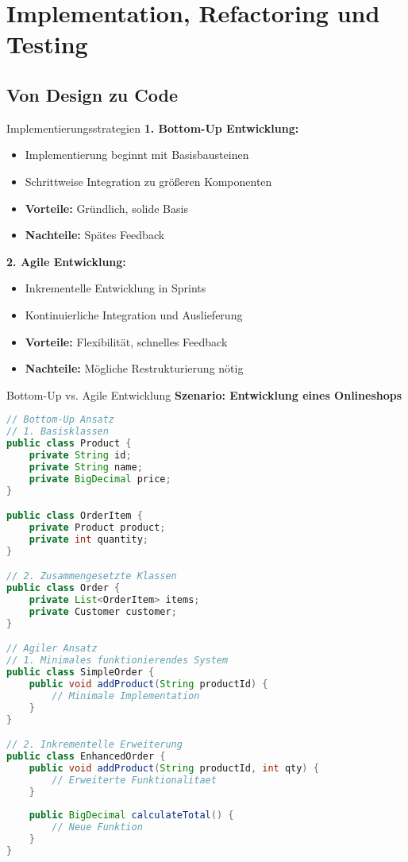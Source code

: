 \section{Implementation, Refactoring und Testing}

\subsection{Von Design zu Code}

\begin{concept}{Implementierungsstrategien}
\textbf{1. Bottom-Up Entwicklung:}
\begin{itemize}
    \item Implementierung beginnt mit Basisbausteinen
    \item Schrittweise Integration zu größeren Komponenten
    \item \textbf{Vorteile:} Gründlich, solide Basis
    \item \textbf{Nachteile:} Spätes Feedback
\end{itemize}

\textbf{2. Agile Entwicklung:}
\begin{itemize}
    \item Inkrementelle Entwicklung in Sprints
    \item Kontinuierliche Integration und Auslieferung
    \item \textbf{Vorteile:} Flexibilität, schnelles Feedback
    \item \textbf{Nachteile:} Mögliche Restrukturierung nötig
\end{itemize}
\end{concept}

\begin{example}{Bottom-Up vs. Agile Entwicklung}
\textbf{Szenario: Entwicklung eines Onlineshops}

\begin{lstlisting}[language=Java]
// Bottom-Up Ansatz
// 1. Basisklassen
public class Product {
    private String id;
    private String name;
    private BigDecimal price;
}

public class OrderItem {
    private Product product;
    private int quantity;
}

// 2. Zusammengesetzte Klassen
public class Order {
    private List<OrderItem> items;
    private Customer customer;
}

// Agiler Ansatz
// 1. Minimales funktionierendes System
public class SimpleOrder {
    public void addProduct(String productId) {
        // Minimale Implementation
    }
}

// 2. Inkrementelle Erweiterung
public class EnhancedOrder {
    public void addProduct(String productId, int qty) {
        // Erweiterte Funktionalitaet
    }
    
    public BigDecimal calculateTotal() {
        // Neue Funktion
    }
}
\end{lstlisting}
\end{example}

